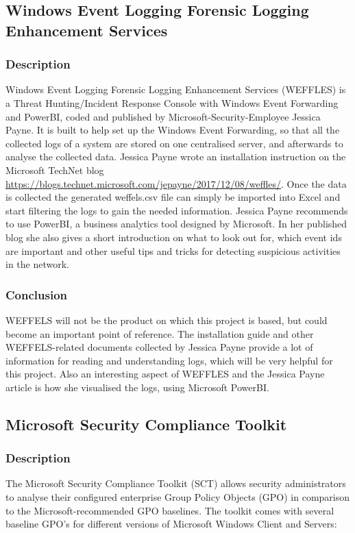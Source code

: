 \subsection{Windows Event Logging Forensic Logging Enhancement Services}\label{WEFFLES}
\subsubsection{Description}
Windows Event Logging Forensic Logging Enhancement Services (WEFFLES) is a Threat Hunting/Incident Response Console with Windows Event Forwarding and PowerBI, coded and published by Microsoft-Security-Employee Jessica Payne. It is built to help set up the Windows Event Forwarding, so that all the collected logs of a system are stored on one centralised server, and afterwards to analyse the collected data. Jessica Payne wrote an installation instruction on the Microsoft TechNet blog \url{https://blogs.technet.microsoft.com/jepayne/2017/12/08/weffles/}. Once the data is collected  the generated weffels.csv file can simply be imported into Excel and start filtering the logs to gain the needed information. Jessica Payne recommends to use PowerBI, a business analytics tool designed by Microsoft. In her published blog she also gives a short introduction on what to look out for, which event ids are important and other useful tips and tricks for detecting suspicious activities in the network.
\subsubsection{Conclusion}
WEFFELS will not be the product on which this project is based, but could become an important point of reference. The installation guide and other WEFFELS-related documents collected by Jessica Payne provide a lot of information for reading and understanding logs, which will be very helpful for this project. Also an interesting aspect of WEFFLES and the Jessica Payne article is how she visualised the logs, using Microsoft PowerBI.


\subsection{Microsoft Security Compliance Toolkit}
\subsubsection{Description}
The Microsoft Security Compliance Toolkit (SCT) \cite{SCT} allows security administrators to analyse their configured enterprise Group Policy Objects (GPO) in comparison to the Microsoft-recommended GPO baselines. The toolkit comes with  several baseline GPO's for different versions of Microsoft Windows Client and Servers:

